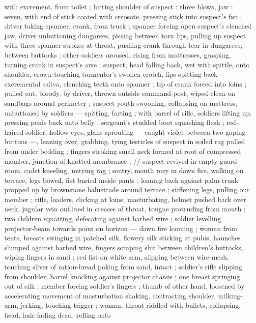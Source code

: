 \documentclass[10pt,twoside]{memoir}
\begin{document}
with excrement, from toilet ; hitting shoulder of suspect : three 
blows, jaw : seven, with end of stick coated with creosote, pressing 
stick into suspect's fist ; driver taking spanner, crank, from truck ; 
spanner forcing open suspect's clenched jaw, driver unbuttoning 
dungarees, pissing between torn lips, pulling up suspect with three 
spanner strokes at throat, pushing crank through tear in dungarees, 
between buttocks ; other soldiers aroused, rising from mattresses, 
grasping, turning crank in suspect's arse ; suspect, head falling back, 
wet with spittle, onto shoulder, crown touching tormentor's swollen 
crotch, lips spitting back excremental saliva, clenching teeth onto 
spanner ; tip of crank forced into loins ; pulled out, bloody, by driver, 
thrown outside command-post, wiped clean on sandbags around 
perimeter ; suspect youth swooning, collapsing on mattress, 
unbuttoned by soldiers --- spitting, farting ; with barrel of rifle, 
soldiers lifting up, pressing penis back onto belly : sergeant's 
studded boot squashing flesh ; red-haired soldier, hollow eyes, glans 
sprouting --- caught violet between two gaping buttons ---, leaning 
over, grabbing, tying testicles of suspect in soiled rag pulled from 
under bedding ; fingers stroking small neck formed at root of 
compressed member, junction of knotted membranes ; // suspect 
revived in empty guard-room, cadet kneeling, untying rag ; sentry, 
mouth rosy in dawn fire, walking on terrace, legs bowed, fist buried 
inside pants ; leaning back against palm-trunk propped up by 
brownstone balustrade around terrace ; stiffening legs, pulling out %
member ; rifle, loaders, clicking at loins, masturbating, helmet 
pushed back over neck, jugular vein outlined in creases of throat, 
tongue protruding from mouth ; two children squatting, defecating 
against barbed wire ; soldier levelling projector-beam towards point 
on horizon --- dawn fire looming ; woman from tents, breasts 
swinging in patched silk, flowery silk sticking at pubis, haunches 
slumped against barbed wire, fingers scraping shit between 
children's buttocks, wiping fingers in sand ; red fist on white arm, 
slipping between wire-mesh, touching sliver of ration-bread poking 
from sand, intact ; soldier's rifle slipping from shoulder, barrel 
knocking against projector chassis ; one breast springing out of silk 
; member forcing soldier's fingers ; thumb of other hand, loosened 
by accelerating movement of masturbation shaking, contracting 
shoulder, milking-arm, jerking, touching trigger ; woman, throat 
riddled with bullets, collapsing, head, hair fading dead, rolling onto 
\end{document}
